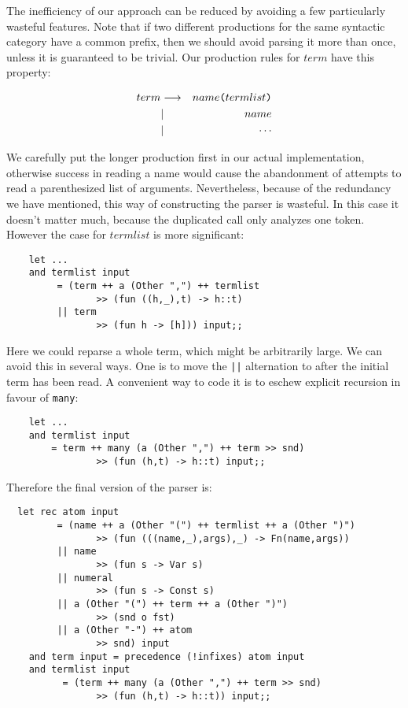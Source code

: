 The inefficiency of our approach can be reduced by avoiding a few particularly
wasteful features. Note that if two different productions for the same
syntactic category have a common prefix, then we should avoid parsing it more
than once, unless it is guaranteed to be trivial. Our production rules for
$term$ have this property:

\begin{eqnarray*}
term     & \goesto & name{\verb!(!} termlist {\verb!)!}         \\
         & |       & name                                       \\
         & |       & \cdots
\end{eqnarray*}

We carefully put the longer production first in our actual implementation,
otherwise success in reading a name would cause the abandonment of attempts to
read a parenthesized list of arguments. Nevertheless, because of the
redundancy we have mentioned, this way of constructing the parser is wasteful.
In this case it doesn't matter much, because the duplicated call only analyzes
one token. However the case for $termlist$ is more significant:

\begin{boxed}\begin{verbatim}
    let ...
    and termlist input
         = (term ++ a (Other ",") ++ termlist
                >> (fun ((h,_),t) -> h::t)
         || term
                >> (fun h -> [h])) input;;
\end{verbatim}\end{boxed}

Here we could reparse a whole term, which might be arbitrarily large. We can
avoid this in several ways. One is to move the {\verb!||!} alternation to after
the initial term has been read. A convenient way to code it is to eschew
explicit recursion in favour of {\tt many}:

\begin{boxed}\begin{verbatim}
    let ...
    and termlist input
        = term ++ many (a (Other ",") ++ term >> snd)
                >> (fun (h,t) -> h::t) input;;
\end{verbatim}\end{boxed}

\noindent Therefore the final version of the parser is:

\begin{boxed}\begin{verbatim}
  let rec atom input
         = (name ++ a (Other "(") ++ termlist ++ a (Other ")")
                >> (fun (((name,_),args),_) -> Fn(name,args))
         || name
                >> (fun s -> Var s)
         || numeral
                >> (fun s -> Const s)
         || a (Other "(") ++ term ++ a (Other ")")
                >> (snd o fst)
         || a (Other "-") ++ atom
                >> snd) input
    and term input = precedence (!infixes) atom input
    and termlist input
          = (term ++ many (a (Other ",") ++ term >> snd)
                >> (fun (h,t) -> h::t)) input;;
\end{verbatim}\end{boxed}

